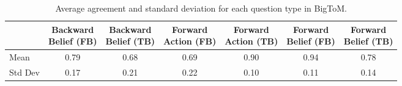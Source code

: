 \begin{table}[ht]
    \small
    \centering
    \begin{tabular}{lcccccc}
        \toprule
        & \makecell{\textbf{Backward}\\\textbf{Belief (FB)}} 
        & \makecell{\textbf{Backward}\\\textbf{Belief (TB)}} 
        & \makecell{\textbf{Forward}\\\textbf{Action (FB)}} 
        & \makecell{\textbf{Forward}\\\textbf{Action (TB)}} 
        & \makecell{\textbf{Forward}\\\textbf{Belief (FB)}} 
        & \makecell{\textbf{Forward}\\\textbf{Belief (TB)}} \\
        \midrule
        Mean & 0.79 & 0.68 & 0.69 & 0.90 & 0.94 & 0.78 \\
        Std Dev & 0.17 & 0.21 & 0.22 & 0.10 & 0.11 & 0.14 \\
        \bottomrule
    \end{tabular}
    \caption{Average agreement and standard deviation for each question type in BigToM.}
    \label{tab:bigtom_agreement}
\end{table}
